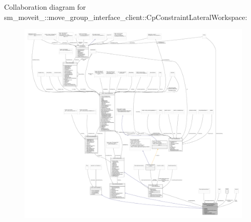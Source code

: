 Collaboration diagram for sm\+\_\+moveit\+\_\+:\+:move\+\_\+group\+\_\+interface\+\_\+client\+:\+:Cp\+Constraint\+Lateral\+Workspace\+:
\nopagebreak
\begin{figure}[H]
\begin{center}
\leavevmode
\includegraphics[width=350pt]{classsm__moveit__4_1_1move__group__interface__client_1_1CpConstraintLateralWorkspace__coll__graph}
\end{center}
\end{figure}
